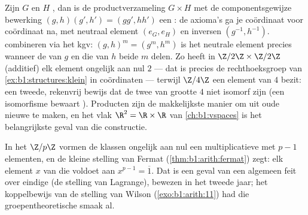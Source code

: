 \begin{example}\label{ex:b1:structures:product}
Zijn $G$ en $H$ , dan is de productverzameling $G \times H$ met de
componentsgewijze bewerking $(g, h)(g', h') = (gg', hh')$ een : de
axioma's ga je coördinaat voor coördinaat na, met neutraal element $(e_G,
e_H)$ en inversen $(g^{-1}, h^{-1})$.  combineren via het kgv: $(g,
h)^m = (g^m, h^m)$ is het neutrale element precies wanneer de  van $g$
en die van $h$ beide $m$ delen. Zo heeft in $\Z/2\Z \times \Z/2\Z$
(additief) elk element ongelijk aan nul  $2$ --- dat is precies de
rechthoeksgroep van \cref{ex:b1:structures:klein} in coördinaten ---
terwijl $\Z/4\Z$ een element van  $4$ bezit: een tweede,
rekenvrij bewijs dat de twee  van grootte $4$ niet isomorf zijn
(een isomorfisme bewaart ). Producten zijn de makkelijkste manier om
uit oude  nieuwe te maken, en het vlak $\R^2 = \R \times \R$ van
\cref{ch:b1:vspaces} is het belangrijkste geval van die constructie.
\end{example}

\begin{remark}
In het  $\Z/p\Z$ vormen de klassen ongelijk aan nul een
multiplicatieve  met $p - 1$ elementen, en de kleine stelling van
Fermat (\cref{thm:b1:arith:fermat}) zegt: elk element $x$ van die 
voldoet aan $x^{p-1} = \overline 1$. Dat is een geval van een algemeen
feit over eindige  (de stelling van Lagrange), bewezen in het
tweede jaar; het koppelbewijs van de stelling van Wilson
(\cref{exo:b1:arith:11}) had die groepentheoretische smaak al.
\end{remark}

